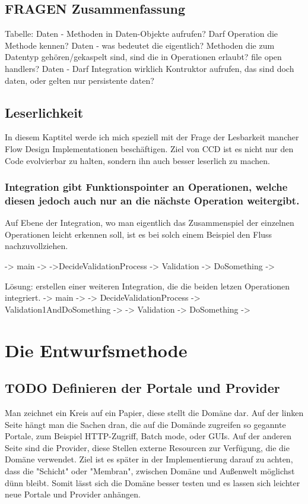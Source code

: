 \documentclass[11pt]{article}
\begin{document}
\subsection{{\bfseries\sffamily FRAGEN} Zusammenfassung}
\label{sec:orgheadline71}

Tabelle:
Daten - Methoden in Daten-Objekte aufrufen? Darf Operation die Methode kennen?
Daten - was bedeutet die eigentlich? Methoden die zum Datentyp
gehören/gekaspelt sind, sind die in Operationen erlaubt? file open handlers?
Daten - Darf Integration wirklich Kontruktor aufrufen, das sind doch daten, oder gelten nur persistente daten?



\subsection{Leserlichkeit}
\label{sec:orgheadline73}
In diesem Kaptitel werde ich mich speziell mit der Frage der Lesbarkeit mancher Flow Design Implementationen beschäftigen.
Ziel von CCD ist es nicht nur den Code evolvierbar zu halten, sondern ihn auch besser leserlich zu machen.

\subsubsection{Integration gibt Funktionspointer an Operationen, welche diesen jedoch auch nur an die nächste Operation weitergibt.}
\label{sec:orgheadline72}
Auf Ebene der Integration, wo man eigentlich das Zusammenspiel der einzelnen Operationen leicht erkennen soll, ist es bei solch einem Beispiel den 
Fluss nachzuvollziehen.

-> main ->
->DecideValidationProcess -> Validation -> DoSomething ->

Lösung: erstellen einer weiteren Integration, die die beiden letzen Operationen integriert.
-> main ->
-> DecideValidationProcess -> Validation1AndDoSomething ->
                          -> Validation -> DoSomething ->


\section{Die Entwurfsmethode}
\label{sec:orgheadline80}

\subsection{{\bfseries\sffamily TODO} Definieren der Portale und Provider}
\label{sec:orgheadline75}
    Man zeichnet ein Kreis auf ein Papier, diese stellt die Domäne dar.
    Auf der linken Seite hängt man die Sachen dran, die auf die Domände zugreifen so gegannte Portale, zum Beispiel HTTP-Zugriff,
    Batch mode, oder GUIs.
    Auf der anderen Seite sind die Provider, diese Stellen externe Resourcen zur Verfügung, die die Domäne verwendet.
    Ziel ist es später in der Implementierung darauf zu achten, dass die "Schicht" oder "Membran", zwischen Domäne und Außenwelt möglichst
dünn bleibt. Somit lässt sich die Domäne besser testen und es lassen sich leichter neue Portale und Provider anhängen.
\end{document}
